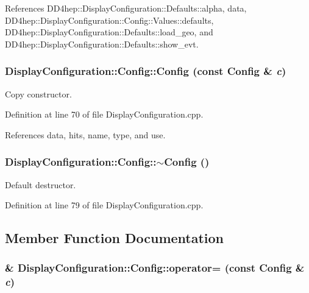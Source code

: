 References DD4hep::DisplayConfiguration::Defaults::alpha, data, DD4hep::DisplayConfiguration::Config::Values::defaults, DD4hep::DisplayConfiguration::Defaults::load\_\-geo, and DD4hep::DisplayConfiguration::Defaults::show\_\-evt.\hypertarget{class_d_d4hep_1_1_display_configuration_1_1_config_ab5d7a0d2cf59ed2ca47afabd66fd2918}{
\subsubsection[{Config}]{\setlength{\rightskip}{0pt plus 5cm}DisplayConfiguration::Config::Config (const {\bf Config} \& {\em c})}}
\label{class_d_d4hep_1_1_display_configuration_1_1_config_ab5d7a0d2cf59ed2ca47afabd66fd2918}


Copy constructor. 

Definition at line 70 of file DisplayConfiguration.cpp.

References data, hits, name, type, and use.\hypertarget{class_d_d4hep_1_1_display_configuration_1_1_config_a3ae52820778d8b7cdf70518bc1504c8f}{
\subsubsection[{$\sim$Config}]{\setlength{\rightskip}{0pt plus 5cm}DisplayConfiguration::Config::$\sim$Config ()}}
\label{class_d_d4hep_1_1_display_configuration_1_1_config_a3ae52820778d8b7cdf70518bc1504c8f}


Default destructor. 

Definition at line 79 of file DisplayConfiguration.cpp.

\subsection{Member Function Documentation}
\hypertarget{class_d_d4hep_1_1_display_configuration_1_1_config_a4fd5de82887e43ea1a99204c73e13c47}{
\subsubsection[{operator=}]{ \& DisplayConfiguration::Config::operator= (const {\bf Config} \& {\em c})}}
\label{class_d_d4hep_1_1_display_configuration_1_1_config_a4fd5de82887e43ea1a99204c73e13c47}


